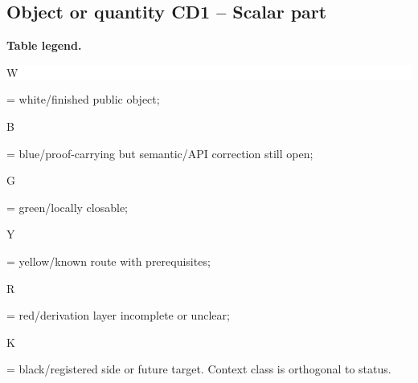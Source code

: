 \subsection*{Object or quantity CD1 -- Scalar part}
\hypertarget{objproof:CD1}{}
\par\smallskip\noindent\begin{minipage}{0.99\linewidth}\footnotesize\raggedright\textbf{Table legend.} \colorbox{white}{\strut W} = white/finished public object; \colorbox{cyan!20}{\strut B} = blue/proof-carrying but semantic/API correction still open; \colorbox{green!18}{\strut G} = green/locally closable; \colorbox{yellow!25}{\strut Y} = yellow/known route with prerequisites; \colorbox{red!20}{\strut R} = red/derivation layer incomplete or unclear; \colorbox{black!18}{\strut K} = black/registered side or future target. Context class is orthogonal to status.\end{minipage}\par\vspace{0.25em}
